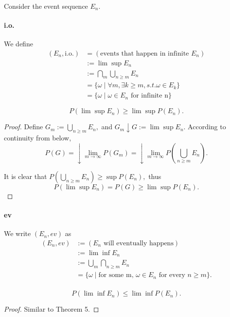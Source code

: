 Consider the event sequence $E_n$.
\paragraph{i.o.} We define 
\begin{equation}
  \nonumber
  \begin{aligned}
    (E_n,\text{i.o.}) &= (\text{events that happen in infinite }E_n) \\
    & := \lim \sup E_n \\
    & := \bigcap_m\bigcup_{n\geq m} E_n \\
    & = \{ \omega \mid \forall m,\exists k \geq m,s.t. \omega\in E_k\}\\
    & = \{ \omega \mid \omega\in E_n \text{ for infinite n}\}
  \end{aligned}
\end{equation}

\begin{theorem}
  $$P(\lim \sup E_n) \geq \lim\sup P(E_n).$$
  \begin{proof}
    Define $G_m := \bigcup_{n\geq m} E_n,$ and $G_m\downarrow G := \lim\sup E_n$. According to continuity from below, 
    $$P(G) = \downarrow\lim_{m\to \infty} P(G_m) = \downarrow\lim_{m\to \infty} P(\bigcup_{n\geq m} E_n).$$
    
    It is clear that $P(\bigcup_{n\geq m} E_n) \geq \sup P(E_n),$ thus 
    $$P(\lim \sup E_n)  = P(G) \geq \lim \sup P(E_n).$$
  \end{proof}
\end{theorem}



\paragraph{ev} We write $(E_n,ev)$ as 
\begin{equation}
  \nonumber
  \begin{aligned}
    (E_n,ev) & := (E_n \text{ will eventually happens}) \\
    & := \lim\inf E_n \\
    & := \bigcup_m \bigcap_{n\geq m} E_n \\
    & = \{\omega \mid \text{for some m, } \omega \in E_n \text{ for every } n\geq m\}. \\
  \end{aligned}
\end{equation}
\begin{theorem}
  $$P(\lim\inf E_n) \leq \lim\inf P(E_n).$$
\end{theorem}
\begin{proof}
  Similar to Theorem 5.
\end{proof}

